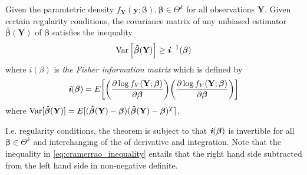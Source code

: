 \begin{theorem} 
\label{th:cramerrao_inequality}
Given the paramtetric density $f_{\textbf{Y}}(\textbf{y};\boldsymbol{\beta}), \boldsymbol{\beta} \in \Theta^k$ for all observations $\textbf{Y}$.
Given certain regularity conditions, the covariance matrix of any unbiased estimator $\boldsymbol{\hat{\beta}}(\textbf{Y})$ of $\boldsymbol{\beta}$ satisfies the inequality
\begin{align} \label{eq:cramerrao_inequality}
    \operatorname{\text{Var}} \Big[ \boldsymbol{\hat{\beta}}(\textbf{Y})\Big] \geq \textit{\textbf{i}}^{-1}(\boldsymbol{\beta})
\end{align}
where $\textit{i}(\beta)$ is \textit{the Fisher information matrix} which is defined by
\begin{align*}
    \textit{\textbf{i}}(\boldsymbol{\beta})=E \bigg[ \bigg(\frac{\partial \log f_Y(\textbf{Y};\boldsymbol{\beta})}{\partial \boldsymbol{\beta}} \bigg)\bigg(\frac{\partial \log f_Y(\textbf{Y};\boldsymbol{\beta})}{\partial \boldsymbol{\beta}}\bigg)\bigg]
\end{align*}
where $\operatorname{\text{Var}} [\boldsymbol{\hat{\beta}}(\textbf{Y})]=E[(\boldsymbol{\hat{\beta}}(\textbf{Y})-\boldsymbol{\beta})(\boldsymbol{\hat{\beta}}(\textbf{Y})-\boldsymbol{\beta})^T]$.
\end{theorem}
I.e. regularity conditions, the theorem is subject to that $\textit{\textbf{i}}(\boldsymbol{\beta})$ is invertible for all $\boldsymbol{\beta} \in \Theta^k$ and interchanging of the of derivative and integration.
Note that the inequality in \eqref{eq:cramerrao_inequality} entails that the right hand side subtracted from the left hand side in non-negative definite.

